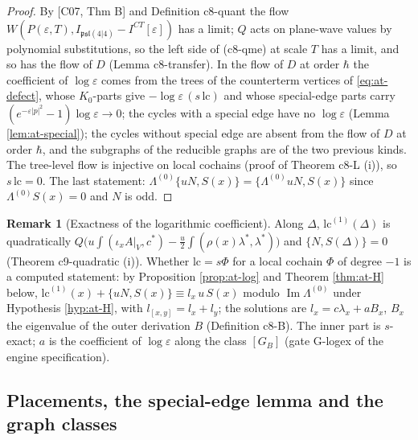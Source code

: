 \documentclass[11pt]{article}
\numberwithin{equation}{section}
\theoremstyle{plain}
\theoremstyle{definition}
\newtheorem{remark}[theorem]{Remark}
\newcommand{\AV}{A|_V}
\newcommand{\ICT}{I^{CT}[\varepsilon]}
\newcommand{\lc}{\mathrm{lc}}
\begin{document}
\begin{proof}
By [C07, Thm B] and Definition c8-quant the flow $W(P(\varepsilon,T),I_{\mathfrak{psl}(4|4)}-\ICT)$ has a limit; $Q$ acts on plane-wave values by polynomial substitutions, so the left side of (c8-qme) at scale $T$ has a limit, and so has the flow of $D$ (Lemma c8-transfer). In the flow of $D$ at order $\hbar$ the coefficient of $\log\varepsilon$ comes from the trees of the counterterm vertices of \eqref{eq:at-defect}, whose $K_0$-parts give $-\log\varepsilon\,(s\,\lc)$ and whose special-edge parts carry $(e^{-\varepsilon|p|^2}-1)\log\varepsilon\to0$; the cycles with a special edge have no $\log\varepsilon$ (Lemma \ref{lem:at-special}); the cycles without special edge are absent from the flow of $D$ at order $\hbar$, and the subgraphs of the reducible graphs are of the two previous kinds. The tree-level flow is injective on local cochains (proof of Theorem c8-L (i)), so $s\,\lc=0$. The last statement: $\Lambda^{(0)}\{uN,S(x)\}=\{\Lambda^{(0)}uN,S(x)\}$ since $\Lambda^{(0)}S(x)=0$ and $N$ is odd.
\end{proof}

\begin{remark}[Exactness of the logarithmic coefficient]
\label{rem:at-logexact}
Along $\Delta$, $\lc^{(1)}(\Delta)$ is quadratically $Q\big(u\int(\iota_x\AV,c^*)-\tfrac u2\int(\rho(x)\lambda^*,\lambda^*)\big)$ and $\{N,S(\Delta)\}=0$ (Theorem c9-quadratic (i)). Whether $\lc=s\Phi$ for a local cochain $\Phi$ of degree $-1$ is a computed statement: by Proposition \ref{prop:at-log} and Theorem \ref{thm:at-H} below, $\lc^{(1)}(x)+\{uN,S(x)\}\equiv l_x\,u\,S(x)$ modulo $\operatorname{Im}\Lambda^{(0)}$ under Hypothesis \ref{hyp:at-H}, with $l_{[x,y]}=l_x+l_y$; the solutions are $l_x=c\lambda_x+aB_x$, $B_x$ the eigenvalue of the outer derivation $B$ (Definition c8-B). The inner part is $s$-exact; $a$ is the coefficient of $\log\varepsilon$ along the class $[G_B]$ (gate G-logex of the engine specification).
\end{remark}

\subsection{Placements, the special-edge lemma and the graph classes}
\end{document}
